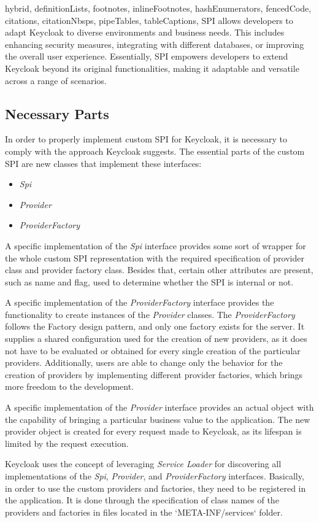 \documentclass[
  digital,     %
  oneside,     %
  nosansbold,  %
  nocolorbold, %
  lof,         %
  lot,         %
]{fithesis4}
\begin{document}
\begin{markdown*}{%
  hybrid,
  definitionLists,
  footnotes,
  inlineFootnotes,
  hashEnumerators,
  fencedCode,
  citations,
  citationNbsps,
  pipeTables,
  tableCaptions,
}
SPI allows developers to adapt Keycloak to diverse environments and business needs.
This includes enhancing security measures, integrating with different databases, or improving the overall user experience. Essentially, SPI empowers developers to extend Keycloak beyond its original functionalities, making it adaptable and versatile across a range of scenarios.

\subsection{Necessary Parts}
In order to properly implement custom SPI for Keycloak, it is necessary to comply with the approach Keycloak suggests.
The essential parts of the custom SPI are new classes that implement these interfaces:
\begin{itemize}
    \item \textit{Spi}
    \item \textit{Provider}
    \item \textit{ProviderFactory}
\end{itemize}

A specific implementation of the \textit{Spi} interface provides some sort of wrapper for the whole custom SPI representation with the required specification of provider class and provider factory class.
Besides that, certain other attributes are present, such as name and flag, used to determine whether the SPI is internal or not.

A specific implementation of the \textit{ProviderFactory} interface provides the functionality to create instances of the \textit{Provider} classes.
The \textit{ProviderFactory} follows the Factory design pattern, and only one factory exists for the server.
It supplies a shared configuration used for the creation of new providers, as it does not have to be evaluated or obtained for every single creation of the particular providers.
Additionally, users are able to change only the behavior for the creation of providers by implementing different provider factories, which brings more freedom to the development.

A specific implementation of the \textit{Provider} interface provides an actual object with the capability of bringing a particular business value to the application.
The new provider object is created for every request made to Keycloak, as its lifespan is limited by the request execution.

Keycloak uses the concept of leveraging \textit{Service Loader} for discovering all implementations of the \textit{Spi}, \textit{Provider}, and \textit{ProviderFactory} interfaces.
Basically, in order to use the custom providers and factories, they need to be registered in the application.
It is done through the specification of class names of the providers and factories in files located in the `META-INF/services` folder.


\end{markdown*}
\end{document}
